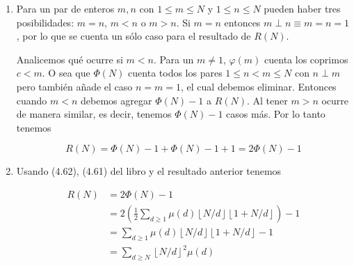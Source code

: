 \documentclass{article}
\newcommand{\piso}[1]{\left \lfloor #1 \right \rfloor}
\begin{document}
\renewcommand{\labelenumi}{(\alph{enumi})}
\begin{enumerate}

\item Para un par de enteros $m,n$ con $1 \leq m \leq N$ y $1 \leq n \leq N$
pueden haber tres posibilidades: $m=n$, $m<n$ o $m>n$. Si $m=n$ entonces
$m \perp n \equiv m=n=1$, por lo que se cuenta un sólo caso para el resultado de
$R(N)$.

Analicemos qué ocurre si $m<n$. Para un $m \neq 1$, $\varphi(m)$ cuenta
los coprimos $c < m$. O sea que $\Phi(N)$ cuenta todos los pares $1 \leq n < m
\leq N$ con $n \perp m$ pero también añade el caso $n=m=1$, el cual debemos
eliminar. Entonces cuando $m<n$ debemos agregar $\Phi(N)-1$ a $R(N)$.
Al tener $m>n$ ocurre de manera similar, es decir, tenemos $\Phi(N)-1$ casos
más. Por lo tanto tenemos

\[
R(N) = \Phi(N)-1 + \Phi(N)-1 + 1 = 2\Phi(N) - 1
\]

\item Usando (4.62), (4.61) del libro y el resultado anterior tenemos

\begin{align*}
R(N)
  & = 2\Phi(N)-1 \\
  & = 2 \left( \frac{1}{2} \sum_{d \geq 1} \mu(d) \piso{N/d} \piso{1+N/d} \right) -1 \\
  & = \sum_{d \geq 1} \mu(d) \piso{N/d} \piso{1+N/d} - 1 \\
  & = \sum_{d \geq N} \piso{N/d}^2 \mu(d)  \\
\end{align*}

\end{enumerate}

\section{}
\end{document}
